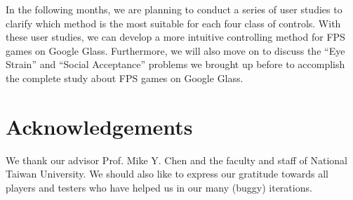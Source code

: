 \documentclass{sig-alternate}
\begin{document}
In the following months, we are planning to conduct a series of user studies to clarify which method is the most suitable for each four class of controls. With these user studies, we can develop a more intuitive controlling method for FPS games on Google Glass. Furthermore, we will also move on to discuss the ``Eye Strain'' and ``Social Acceptance'' problems we brought up before to accomplish the complete study about FPS games on Google Glass.


\section{Acknowledgements}
We thank our advisor Prof. Mike Y. Chen and the faculty and staff of National Taiwan University. We should also like to express our gratitude towards all players and testers who have helped us in our many (buggy) iterations.

\balance



\end{document}
